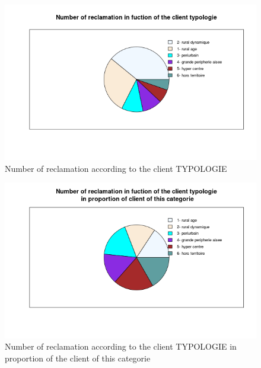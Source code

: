 \documentclass[a4paper, 11pt]{article}
\begin{document}
    \begin{figure}[!ht]
    	\centering
            \includegraphics[height = 10 cm]{Valentin/Number_of_reclamation_in_fuction_of_the_client_typologie.png}
            \caption{Number of reclamation according to the client TYPOLOGIE}
            \label{fig:reclamtion_typo}
    \end{figure}
    
    \begin{figure}[!ht]
    	\centering
            \includegraphics[height = 10 cm]{Valentin/Number_of_reclamation_in_fuction_of_the_client_typologie_in_proportion.png}
            \caption{Number of reclamation according to the client TYPOLOGIE in proportion of the client of this categorie}
            \label{fig:reclamtion_typo2}
    \end{figure}
    
\end{document}
